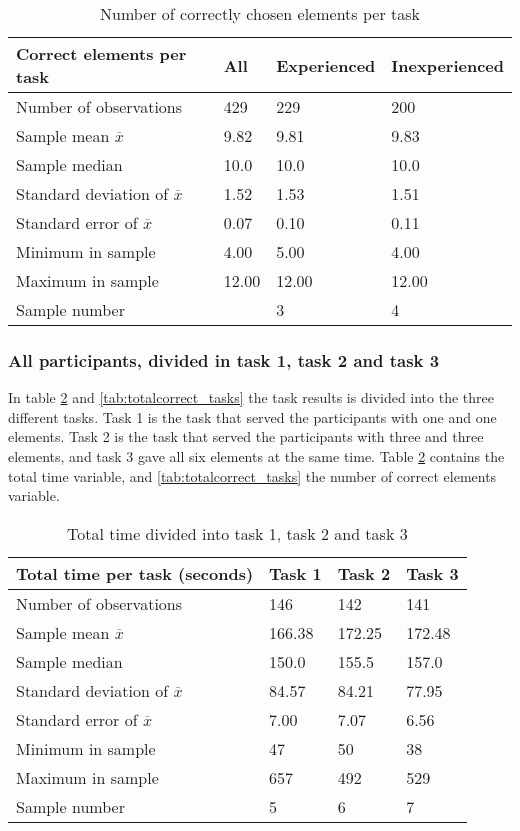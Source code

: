 \begin{table}[H]
	\centering
	\begin{tabular}{l|l|l|l}
		Correct elements per task  & All  & Experienced & Inexperienced \\ \hline
		Number of observations & 429    & 229  & 200   \\
		Sample mean $\overline{x}$   & 9.82 & 9.81  & 9.83  \\
		Sample median & 10.0 & 10.0 & 10.0 \\
		Standard deviation of $\overline{x}$   & 1.52  & 1.53  &  1.51 \\
		Standard error of $\overline{x}$   & 0.07  & 0.10 &  0.11 \\
		Minimum in sample & 4.00 & 5.00  &  4.00  \\
		Maximum in sample  & 12.00 & 12.00  & 12.00  \\ \hline
		Sample number &   & 3  & 4   \\ \hline
	\end{tabular}
	\caption[Correct elements, all participants]{Number of correctly chosen elements per task}
	\label{tab:totalcorrect_all}
\end{table}

\subsubsection{All participants, divided in task 1, task 2 and task 3}\label{sec:taskdivided_all}

In table \ref{tab:totaltime_tasks} and \ref{tab:totalcorrect_tasks} the task results is divided into the three different tasks. Task 1 is the task that served the participants with one and one elements. Task 2 is the task that served the participants with three and three elements, and task 3 gave all six elements at the same time. Table  \ref{tab:totaltime_tasks} contains the total time variable, and \ref{tab:totalcorrect_tasks} the number of correct elements variable. 

\begin{table}[H]
	\centering
	\begin{tabular}{l|l|l|l}
		Total time per task (seconds) & Task 1 & Task 2 & Task 3 \\ \hline
		Number of observations & 146    & 142      & 141     \\
		Sample mean $\overline{x}$  & 166.38  &  172.25   &   172.48  \\
		Sample median & 150.0  &  155.5  & 157.0  \\
		Standard deviation of $\overline{x}$   & 84.57  & 84.21  & 77.95   \\
		Standard error of $\overline{x}$   & 7.00 & 7.07 & 6.56 \\
		Minimum in sample    & 47  & 50 &   38   \\
		Maximum in sample   & 657 & 492  & 529 \\ \hline
		Sample number & 5  & 6  & 7    \\ \hline
	\end{tabular}
	\caption[Total time, divided into task 1, 2 and 3]{Total time divided into task 1, task 2 and task 3}
	\label{tab:totaltime_tasks}
\end{table}

